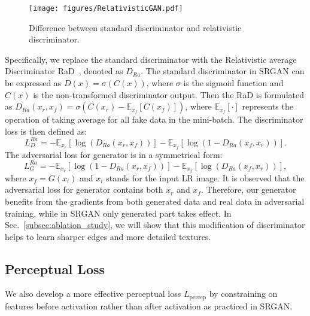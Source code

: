 \documentclass[runningheads]{llncs}
\begin{document}
\begin{figure}[htbp]
	\begin{center}
		\texttt{[image: figures/RelativisticGAN.pdf]}
	\end{center}
	\vspace{-0.4cm}
	\caption{Difference between standard discriminator and relativistic discriminator.}
	\label{fig:RelativisticGAN}
	\vspace{-0.4cm}
\end{figure}

Specifically, we replace the standard discriminator with the Relativistic average Discriminator 
RaD~\cite{jolicoeur2018relativistic}, denoted as $D_{Ra}$. The standard discriminator in SRGAN can be expressed as 
$D(x)=\sigma(C(x))$, where $\sigma$ is the sigmoid 
function and $C(x)$ is the non-transformed discriminator output. Then the RaD is formulated as $D_{Ra}(x_r, 
x_f)=\sigma(C(x_r)-\mathbb{E}_{x_f}[C(x_f)])$, where $\mathbb{E}_{x_f}[\cdot]$ represents the operation of taking 
average for all fake data in the mini-batch. The discriminator loss is then defined as:
%
\begin{equation}
L_{D}^{Ra} = -\mathbb{E}_{x_r}[\log(D_{Ra}(x_r, x_f))] - \mathbb{E}_{x_f}[\log(1 - D_{Ra}(x_f, x_r))].
\end{equation}
%
The adversarial loss for generator is in a symmetrical form:
%
\begin{equation}
L_{G}^{Ra} = -\mathbb{E}_{x_r}[\log(1 - D_{Ra}(x_r, x_f))] - \mathbb{E}_{x_f}[\log(D_{Ra}(x_f, x_r))],
\end{equation}
%
where $x_f=G(x_i)$ and $x_i$ stands for the input LR image. 
%
It is observed that the adversarial loss for generator contains both $x_r$ and $x_f$.
Therefore, our generator benefits from the gradients from both generated data and real data in adversarial training, 
while in SRGAN only generated part takes effect. 
%
In Sec.~\ref{subsec:ablation_study}, we will show that this modification of discriminator helps to learn sharper edges 
and more detailed textures.

\subsection{Perceptual Loss} \label{subsec:perceptual_loss}

We also develop a more effective perceptual loss $L_\text{percep}$ by constraining on features before activation rather 
than after activation as practiced in SRGAN.
\end{document}
